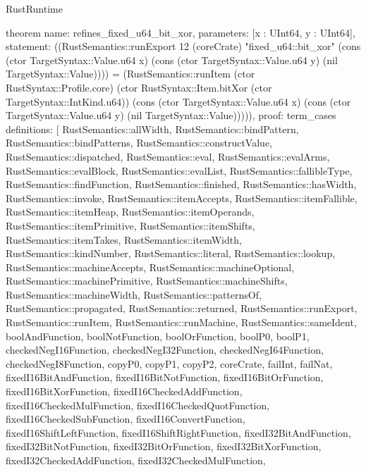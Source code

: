 \begin{lexlean}{RustRuntime}
\begin{semanticmodule}
theorem{
  name: refines_fixed_u64_bit_xor,
  parameters: [x : UInt64, y : UInt64],
  statement: ((RustSemantics::runExport 12 (coreCrate) "fixed_u64::bit_xor" (cons (ctor TargetSyntax::Value.u64 x) (cons (ctor TargetSyntax::Value.u64 y) (nil TargetSyntax::Value)))) = (RustSemantics::runItem (ctor RustSyntax::Profile.core) (ctor RustSyntax::Item.bitXor (ctor TargetSyntax::IntKind.u64)) (cons (ctor TargetSyntax::Value.u64 x) (cons (ctor TargetSyntax::Value.u64 y) (nil TargetSyntax::Value))))),
  proof: term_cases{
    definitions: [
      RustSemantics::allWidth,
      RustSemantics::bindPattern,
      RustSemantics::bindPatterns,
      RustSemantics::constructValue,
      RustSemantics::dispatched,
      RustSemantics::eval,
      RustSemantics::evalArms,
      RustSemantics::evalBlock,
      RustSemantics::evalList,
      RustSemantics::fallibleType,
      RustSemantics::findFunction,
      RustSemantics::finished,
      RustSemantics::hasWidth,
      RustSemantics::invoke,
      RustSemantics::itemAccepts,
      RustSemantics::itemFallible,
      RustSemantics::itemHeap,
      RustSemantics::itemOperands,
      RustSemantics::itemPrimitive,
      RustSemantics::itemShifts,
      RustSemantics::itemTakes,
      RustSemantics::itemWidth,
      RustSemantics::kindNumber,
      RustSemantics::literal,
      RustSemantics::lookup,
      RustSemantics::machineAccepts,
      RustSemantics::machineOptional,
      RustSemantics::machinePrimitive,
      RustSemantics::machineShifts,
      RustSemantics::machineWidth,
      RustSemantics::patternsOf,
      RustSemantics::propagated,
      RustSemantics::returned,
      RustSemantics::runExport,
      RustSemantics::runItem,
      RustSemantics::runMachine,
      RustSemantics::sameIdent,
      boolAndFunction,
      boolNotFunction,
      boolOrFunction,
      boolP0,
      boolP1,
      checkedNegI16Function,
      checkedNegI32Function,
      checkedNegI64Function,
      checkedNegI8Function,
      copyP0,
      copyP1,
      copyP2,
      coreCrate,
      failInt,
      failNat,
      fixedI16BitAndFunction,
      fixedI16BitNotFunction,
      fixedI16BitOrFunction,
      fixedI16BitXorFunction,
      fixedI16CheckedAddFunction,
      fixedI16CheckedMulFunction,
      fixedI16CheckedQuotFunction,
      fixedI16CheckedSubFunction,
      fixedI16ConvertFunction,
      fixedI16ShiftLeftFunction,
      fixedI16ShiftRightFunction,
      fixedI32BitAndFunction,
      fixedI32BitNotFunction,
      fixedI32BitOrFunction,
      fixedI32BitXorFunction,
      fixedI32CheckedAddFunction,
      fixedI32CheckedMulFunction,
}}
\end{semanticmodule}
\end{lexlean}
